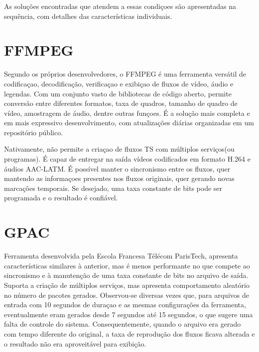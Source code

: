 \documentclass[
	12pt,				%
	openright,			%
	twoside,			%
	a4paper,			%
	brazil,
	french,				%
	english
	]{abntex2}
\begin{document}
As soluções encontradas que atendem a essas condiçoes são apresentadas na sequência, com detalhes das características individuais.




\section{FFMPEG}

Segundo os próprios desenvolvedores, o FFMPEG é uma ferramenta versátil de codificaçao, decodificação, verificaçao e exibiçao de fluxos de vídeo, áudio e legendas. Com um conjunto vasto de bibliotecas de código aberto, permite conversão entre diferentes formatos, taxa de quadros, tamanho de quadro de vídeo, amostragem de áudio, dentre outras funçoes. É a solução mais completa e em mais expressivo desenvolvimento, com atualizações diárias organizadas em um repositório público.

Nativamente, não permite a criaçao de fluxos TS com múltiplos serviços(ou programas). É capaz de entregar na saída vídeos codificados em formato H.264 e áudios AAC-LATM. É possível manter o sincronismo entre os fluxos, quer mantendo as informaçoes presentes nos fluxos originais, quer gerando novas marcações temporais. Se desejado, uma taxa constante de bits pode ser programada e o resultado é confiável.

\section{GPAC}

Ferramenta desenvolvida pela Escola Francesa Télécom ParisTech, apresenta características similares à anterior, mas é menos performante no que compete ao sincronismo e à manutenção de uma taxa constante de bits no arquivo de saída. Suporta a criação de múltiplos serviços, mas apresenta comportamento aleatório no número de pacotes gerados. Observou-se diversas vezes que, para arquivos de entrada com 10 segundos de duraçao e as mesmas configurações da ferramenta, eventualmente eram gerados desde 7 segundos até 15 segundos, o que sugere uma falta de controle do sistema. Consequentemente, quando o arquivo era gerado com tempo diferente do original, a taxa de reprodução dos fluxos ficava alterada e o resultado não era aproveitável para exibição.
\end{document}
